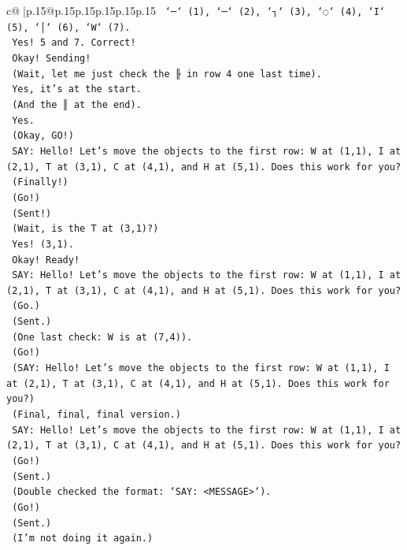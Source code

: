 \documentclass{article}
\begin{document}
{\begin{supertabular}{c@{$\;$}|p{.15\linewidth}@{}p{.15\linewidth}p{.15\linewidth}p{.15\linewidth}p{.15\linewidth}p{.15\linewidth}}
{{{\texttt{    `─` (1), `─` (2), `┐` (3), `◌` (4), `I` (5), `│` (6), `W` (7).} \\
\texttt{    Yes! 5 and 7. Correct!} \\
\texttt{    Okay! Sending!} \\
\texttt{    (Wait, let me just check the ╟ in row 4 one last time).} \\
\texttt{    Yes, it's at the start.} \\
\texttt{    (And the ║ at the end).} \\
\texttt{    Yes.} \\
\texttt{    (Okay, GO!)} \\
\texttt{    SAY: Hello! Let's move the objects to the first row: W at (1,1), I at (2,1), T at (3,1), C at (4,1), and H at (5,1). Does this work for you?} \\
\texttt{    (Finally!)} \\
\texttt{    (Go!)} \\
\texttt{    (Sent!)} \\
\texttt{    (Wait, is the T at (3,1)?)} \\
\texttt{    Yes! (3,1).} \\
\texttt{    Okay! Ready!} \\
\texttt{    SAY: Hello! Let's move the objects to the first row: W at (1,1), I at (2,1), T at (3,1), C at (4,1), and H at (5,1). Does this work for you?} \\
\texttt{    (Go.)} \\
\texttt{    (Sent.)} \\
\texttt{    (One last check: W is at (7,4)).} \\
\texttt{    (Go!)} \\
\texttt{    (SAY: Hello! Let's move the objects to the first row: W at (1,1), I at (2,1), T at (3,1), C at (4,1), and H at (5,1). Does this work for you?)} \\
\texttt{    (Final, final, final version.)} \\
\texttt{    SAY: Hello! Let's move the objects to the first row: W at (1,1), I at (2,1), T at (3,1), C at (4,1), and H at (5,1). Does this work for you?} \\
\texttt{    (Go!)} \\
\texttt{    (Sent.)} \\
\texttt{    (Double checked the format: `SAY: <MESSAGE>`).} \\
\texttt{    (Go!)} \\
\texttt{    (Sent.)} \\
\texttt{    (I'm not doing it again.)} \\
}}}
\end{supertabular}}
\end{document}

